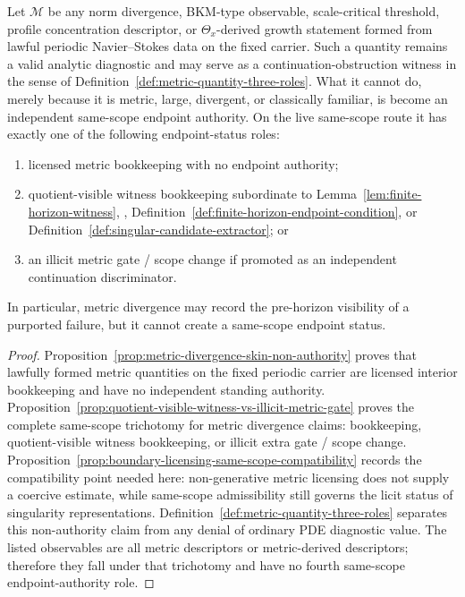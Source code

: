\begin{manualtheorem}
\label{thm:metric-non-authority-periodic-carrier}
Let $\mathcal M$ be any norm divergence, BKM-type observable, scale-critical threshold, profile concentration descriptor, or $\Theta_x$-derived growth statement formed from lawful periodic Navier--Stokes data on the fixed carrier. Such a quantity remains a valid analytic diagnostic and may serve as a continuation-obstruction witness in the sense of Definition~\ref{def:metric-quantity-three-roles}. What it cannot do, merely because it is metric, large, divergent, or classically familiar, is become an independent same-scope endpoint authority. On the live same-scope route it has exactly one of the following endpoint-status roles:
\begin{enumerate}[label=(\roman*), leftmargin=2.2em]
\item licensed metric bookkeeping with no endpoint authority;
\item quotient-visible witness bookkeeping subordinate to Lemma~\ref{lem:finite-horizon-witness}, \HorizonDetectabilityRef{}, Definition~\ref{def:finite-horizon-endpoint-condition}, or Definition~\ref{def:singular-candidate-extractor}; or
\item an illicit metric gate / scope change if promoted as an independent continuation discriminator.
\end{enumerate}
In particular, metric divergence may record the pre-horizon visibility of a purported failure, but it cannot create a same-scope endpoint status.
\end{manualtheorem}

\begin{proof}
Proposition~\ref{prop:metric-divergence-skin-non-authority} proves that lawfully formed metric quantities on the fixed periodic carrier are licensed interior bookkeeping and have no independent standing authority. Proposition~\ref{prop:quotient-visible-witness-vs-illicit-metric-gate} proves the complete same-scope trichotomy for metric divergence claims: bookkeeping, quotient-visible witness bookkeeping, or illicit extra gate / scope change. Proposition~\ref{prop:boundary-licensing-same-scope-compatibility} records the compatibility point needed here: non-generative metric licensing does not supply a coercive estimate, while same-scope admissibility still governs the licit status of singularity representations. Definition~\ref{def:metric-quantity-three-roles} separates this non-authority claim from any denial of ordinary PDE diagnostic value. The listed observables are all metric descriptors or metric-derived descriptors; therefore they fall under that trichotomy and have no fourth same-scope endpoint-authority role.
\end{proof}

